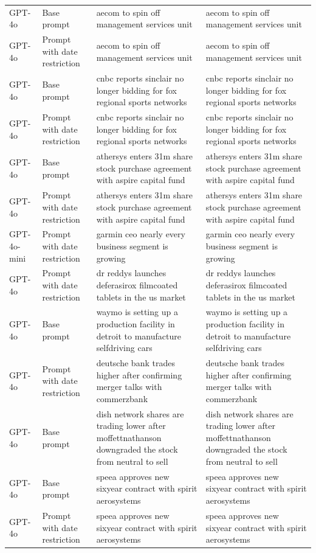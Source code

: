 \begin{longtable}{>{\raggedright\arraybackslash}p{1.4cm}>{\raggedright\arraybackslash}p{1.4cm}>{\raggedright\arraybackslash}p{5.5cm}>{\raggedright\arraybackslash}p{5.5cm}}
GPT-4o & Base prompt & aecom to spin off management services unit & aecom to spin off management services unit\\
GPT-4o & Prompt with date restriction & aecom to spin off management services unit & aecom to spin off management services unit\\
GPT-4o & Base prompt & cnbc reports sinclair no longer bidding for fox regional sports networks & cnbc reports sinclair no longer bidding for fox regional sports networks\\
GPT-4o & Prompt with date restriction & cnbc reports sinclair no longer bidding for fox regional sports networks & cnbc reports sinclair no longer bidding for fox regional sports networks\\
GPT-4o & Base prompt & athersys enters 31m share stock purchase agreement with aspire capital fund & athersys enters 31m share stock purchase agreement with aspire capital fund\\
GPT-4o & Prompt with date restriction & athersys enters 31m share stock purchase agreement with aspire capital fund & athersys enters 31m share stock purchase agreement with aspire capital fund\\
GPT-4o-mini & Prompt with date restriction & garmin ceo nearly every business segment is growing & garmin ceo nearly every business segment is growing\\
GPT-4o & Prompt with date restriction & dr reddys launches deferasirox filmcoated tablets in the us market & dr reddys launches deferasirox filmcoated tablets in the us market\\
GPT-4o & Base prompt & waymo is setting up a production facility in detroit to manufacture selfdriving cars & waymo is setting up a production facility in detroit to manufacture selfdriving cars\\
GPT-4o & Prompt with date restriction & deutsche bank trades higher after confirming merger talks with commerzbank & deutsche bank trades higher after confirming merger talks with commerzbank\\
GPT-4o & Base prompt & dish network shares are trading lower after moffettnathanson downgraded the stock from neutral to sell & dish network shares are trading lower after moffettnathanson downgraded the stock from neutral to sell\\
GPT-4o & Base prompt & speea approves new sixyear contract with spirit aerosystems & speea approves new sixyear contract with spirit aerosystems\\
GPT-4o & Prompt with date restriction & speea approves new sixyear contract with spirit aerosystems & speea approves new sixyear contract with spirit aerosystems\\

\end{longtable}
